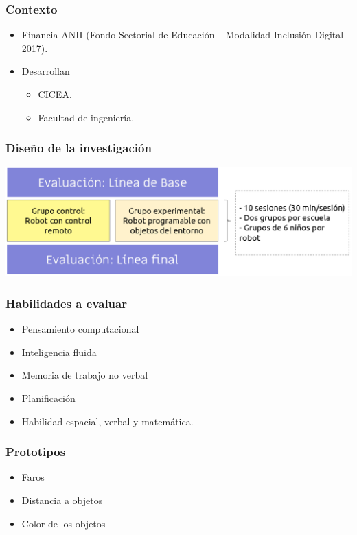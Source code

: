 \documentclass[spanish]{beamer}
\begin{document}
\begin{frame}
	\frametitle{Contexto}
	\begin{itemize}
		\item Financia ANII (Fondo Sectorial de Educación – Modalidad Inclusión Digital 2017).
		\item Desarrollan
		\begin{itemize}
			\item CICEA.
			\item Facultad de ingeniería.
		\end{itemize}
	\end{itemize}
\end{frame}

\begin{frame}
	\frametitle{Diseño de la investigación}
	\begin{center}
		\includegraphics[width=\textwidth]{diseno-investigacion.png}
	\end{center}
\end{frame}

\begin{frame}
	\frametitle{Habilidades a evaluar}
	\begin{itemize}
		\item Pensamiento computacional
		\item Inteligencia fluida
		\item Memoria de trabajo no verbal
		\item Planificación
		\item Habilidad espacial, verbal y matemática.
	\end{itemize}
\end{frame}

\begin{frame}
	\frametitle{Prototipos}
	\begin{itemize}
		\item Faros
		\item Distancia a objetos
		\item Color de los objetos
	\end{itemize}
\end{frame}
\end{document}
